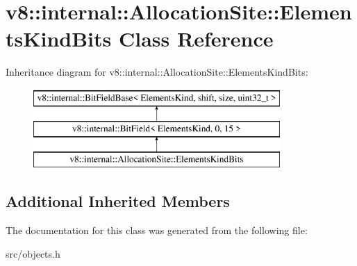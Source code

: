 \hypertarget{classv8_1_1internal_1_1_allocation_site_1_1_elements_kind_bits}{}\section{v8\+:\+:internal\+:\+:Allocation\+Site\+:\+:Elements\+Kind\+Bits Class Reference}
\label{classv8_1_1internal_1_1_allocation_site_1_1_elements_kind_bits}
Inheritance diagram for v8\+:\+:internal\+:\+:Allocation\+Site\+:\+:Elements\+Kind\+Bits\+:\begin{figure}[H]
\begin{center}
\leavevmode
\includegraphics[height=3.000000cm]{classv8_1_1internal_1_1_allocation_site_1_1_elements_kind_bits}
\end{center}
\end{figure}
\subsection*{Additional Inherited Members}


The documentation for this class was generated from the following file\+:\begin{DoxyCompactItemize}
\item 
src/objects.\+h\end{DoxyCompactItemize}
